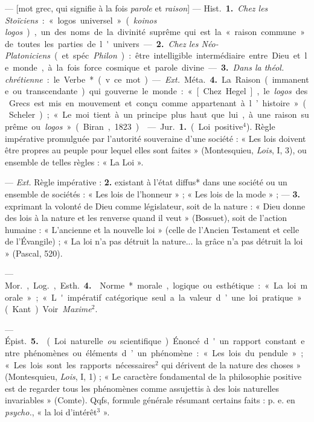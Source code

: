 \begin{itemize}[leftmargin=1cm, label=, itemsep=1pt]
 — [mot grec, qui signifie à la fois {\it parole} et {\it raison}]
— \si{Hist.} {\bf 1.} {\it Chez les Stoïciens} : « logos universel »
({\it koinos logos}), un des noms de la
divinité suprême qui est la « raison commune » de toutes les parties de
l'univers. — {\bf 2.} {\it Chez les Néo-Platoniciens} (et spéc.
{\it Philon}) : être intelligible intermédiaire entre Dieu et le monde, à la
fois force cosmique et parole divine. — {\bf 3.} {\it Dans la théol.
chrétienne} : le Verbe* (v. ce mot).

— {\it Ext.} \si{Méta.} {\bf 4.} La Raison (immanente ou transcendante) qui
gouverne le monde : « [Chez Hegel], le {\it logos} des Grecs est mis en
mouvement et conçu comme appartenant à l’histoire » (Scheler) ; « Le moi
tient à un principe plus haut que lui, à une raison suprême ou
{\it logos} » (Biran, 1823).

 — \si{Jur.} {\bf 1.} (Loi positive$^4$). Règle impérative promulguée
par l'autorité souveraine d’une société : « Les lois doivent être propres au
peuple pour lequel elles sont faites » (Montesquieu, {\it Lois}, I, 3), ou
ensemble de telles règles : « La Loi ».

— {\it Ext.} Règle impérative : {\bf 2.} existant à l’état diffus* dans une
société ou un ensemble de sociétés : « Les lois de l'honneur » ; « Les lois
de la mode » ; — {\bf 3.} exprimant la volonté de Dieu comme législateur,
soit de la nature : « Dieu donne des lois à la nature et les renverse quand
il veut » (Bossuet), soit de l'action humaine : « L'ancienne et la nouvelle
loi » (celle de l'Ancien Testament et celle de l'Évangile) ; « La loi n'a pas
détruit la nature... la grâce n’a pas détruit la loi » (Pascal, 520).

— \si{Mor.}, \si{Log.}, \si{Esth.} {\bf 4.}  Norme* morale,
logique ou esthétique : « La loi morale » ; « L'impératif catégorique seul a
la valeur d’une loi pratique » (Kant). Voir {\it Maxime}$^2$.

— \si{Épist.} {\bf 5.}  (Loi naturelle {\it ou} scientifique).
Énoncé d'un rapport constant entre phénomènes ou éléments d’un phénomène :
« Les lois
du pendule » ; « Les lois sont les rapports nécessaires$^2$ qui dérivent de
la nature des choses » (Montesquieu, {\it Lois}, I, 1) ; « Le caractère
fondamental de la philosophie positive est de regarder tous les phénomènes
comme assujettis à des lois naturelles invariables » (Comte). Qqfs, formule
générale résumant certains faits : p. e. en {\it psycho.}, « la loi
d’intérêt$^3$ ».


\end{itemize}
